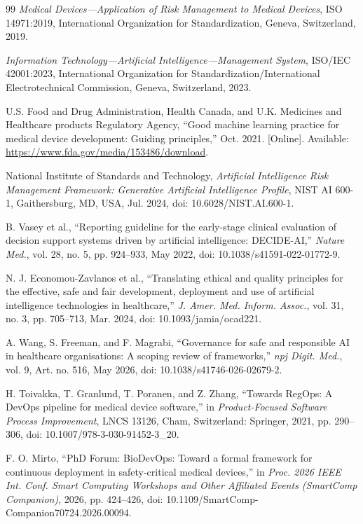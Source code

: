 \documentclass[journal,twoside,web]{ieeecolor}
\begin{document}
\begin{thebibliography}{99}
\textit{Medical Devices---Application of Risk Management to Medical Devices},
ISO 14971:2019, International Organization for Standardization, Geneva, Switzerland, 2019.

\textit{Information Technology---Artificial Intelligence---Management System},
ISO/IEC 42001:2023, International Organization for Standardization/International Electrotechnical Commission, Geneva, Switzerland, 2023.

U.S. Food and Drug Administration, Health Canada, and U.K. Medicines and Healthcare products Regulatory Agency,
``Good machine learning practice for medical device development: Guiding principles,'' Oct. 2021.
[Online]. Available: \url{https://www.fda.gov/media/153486/download}.

National Institute of Standards and Technology,
\textit{Artificial Intelligence Risk Management Framework: Generative Artificial Intelligence Profile}, NIST AI 600-1,
Gaithersburg, MD, USA, Jul. 2024, doi: 10.6028/NIST.AI.600-1.

B. Vasey et al.,
``Reporting guideline for the early-stage clinical evaluation of decision support systems driven by artificial intelligence: DECIDE-AI,''
\textit{Nature Med.}, vol. 28, no. 5, pp. 924--933, May 2022, doi: 10.1038/s41591-022-01772-9.

N. J. Economou-Zavlanos et al.,
``Translating ethical and quality principles for the effective, safe and fair development, deployment and use of artificial intelligence technologies in healthcare,''
\textit{J. Amer. Med. Inform. Assoc.}, vol. 31, no. 3, pp. 705--713, Mar. 2024, doi: 10.1093/jamia/ocad221.

A. Wang, S. Freeman, and F. Magrabi,
``Governance for safe and responsible AI in healthcare organisations: A scoping review of frameworks,''
\textit{npj Digit. Med.}, vol. 9, Art. no. 516, May 2026, doi: 10.1038/s41746-026-02679-2.

H. Toivakka, T. Granlund, T. Poranen, and Z. Zhang,
``Towards RegOps: A DevOps pipeline for medical device software,''
in \textit{Product-Focused Software Process Improvement}, LNCS 13126,
Cham, Switzerland: Springer, 2021, pp. 290--306,
doi: 10.1007/978-3-030-91452-3\_20.

F. O. Mirto,
``PhD Forum: BioDevOps: Toward a formal framework for continuous deployment in safety-critical medical devices,''
in \textit{Proc. 2026 IEEE Int. Conf. Smart Computing Workshops and Other Affiliated Events (SmartComp Companion)},
2026, pp. 424--426,
doi: 10.1109/SmartComp-Companion70724.2026.00094.


\end{thebibliography}
\end{document}

